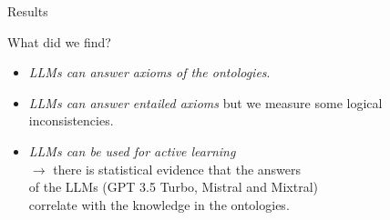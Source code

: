 \documentclass[presentation]{beamer}\mode<presentation>{\usetheme{blackAMSBolognaFC}}
\begin{document}
\begin{frame}[c]{Results}


    What did we find?
    \vfill
    \begin{itemize}
        \item \emph{LLMs can answer axioms of the ontologies}.
        \vfill
        \item \emph{LLMs can answer entailed axioms} but we measure some logical inconsistencies.
        \vfill
        \item \emph{LLMs can be used for active learning}
        \\
        $\rightarrow$ there is statistical evidence that the answers
        \\
        of the LLMs (GPT 3.5 Turbo, Mistral and Mixtral)
        \\
        correlate with the knowledge in the ontologies.
    \end{itemize}

\end{frame}

\section*{}
\frame{\titlepage}

\section*{\bibname}
\end{document}
